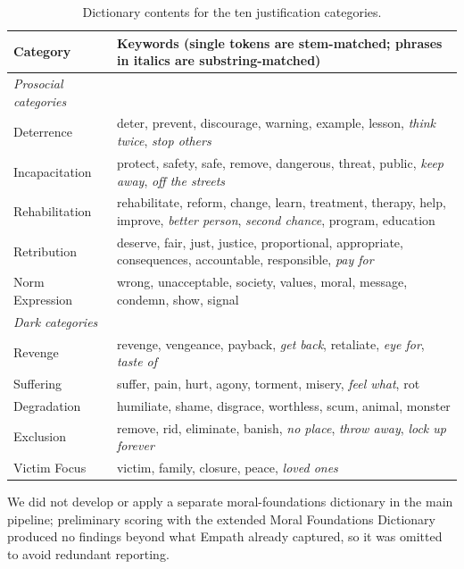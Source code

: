 \begin{table}[htbp]
  \centering
  \caption{Dictionary contents for the ten justification categories.}
  \label{tab:supp_dict}
  \footnotesize
  \begin{tabular}{lp{}}
    \toprule
    Category & Keywords (single tokens are stem-matched; phrases in italics are substring-matched) \\
    \midrule
    \textit{Prosocial categories} \\
    Deterrence       & deter, prevent, discourage, warning, example, lesson, \textit{think twice}, \textit{stop others} \\
    Incapacitation   & protect, safety, safe, remove, dangerous, threat, public, \textit{keep away}, \textit{off the streets} \\
    Rehabilitation   & rehabilitate, reform, change, learn, treatment, therapy, help, improve, \textit{better person}, \textit{second chance}, program, education \\
    Retribution      & deserve, fair, just, justice, proportional, appropriate, consequences, accountable, responsible, \textit{pay for} \\
    Norm Expression  & wrong, unacceptable, society, values, moral, message, condemn, show, signal \\
    \addlinespace
    \textit{Dark categories} \\
    Revenge          & revenge, vengeance, payback, \textit{get back}, retaliate, \textit{eye for}, \textit{taste of} \\
    Suffering        & suffer, pain, hurt, agony, torment, misery, \textit{feel what}, rot \\
    Degradation      & humiliate, shame, disgrace, worthless, scum, animal, monster \\
    Exclusion        & remove, rid, eliminate, banish, \textit{no place}, \textit{throw away}, \textit{lock up forever} \\
    Victim Focus     & victim, family, closure, peace, \textit{loved ones} \\
    \bottomrule
  \end{tabular}
\end{table}

We did not develop or apply a separate moral-foundations dictionary in the main pipeline; preliminary scoring with the extended Moral Foundations Dictionary produced no findings beyond what Empath \citep{fast2016empath} already captured, so it was omitted to avoid redundant reporting.

